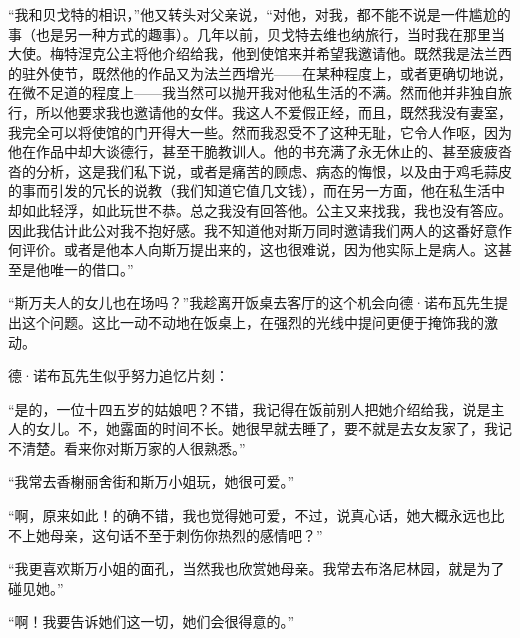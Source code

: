 \par “我和贝戈特的相识，”他又转头对父亲说，“对他，对我，都不能不说是一件尴尬的事（也是另一种方式的趣事）。几年以前，贝戈特去维也纳旅行，当时我在那里当大使。梅特涅克公主将他介绍给我，他到使馆来并希望我邀请他。既然我是法兰西的驻外使节，既然他的作品又为法兰西增光——在某种程度上，或者更确切地说，在微不足道的程度上——我当然可以抛开我对他私生活的不满。然而他并非独自旅行，所以他要求我也邀请他的女伴。我这人不爱假正经，而且，既然我没有妻室，我完全可以将使馆的门开得大一些。然而我忍受不了这种无耻，它令人作呕，因为他在作品中却大谈德行，甚至干脆教训人。他的书充满了永无休止的、甚至疲疲沓沓的分析，这是我们私下说，或者是痛苦的顾虑、病态的悔恨，以及由于鸡毛蒜皮的事而引发的冗长的说教（我们知道它值几文钱），而在另一方面，他在私生活中却如此轻浮，如此玩世不恭。总之我没有回答他。公主又来找我，我也没有答应。因此我估计此公对我不抱好感。我不知道他对斯万同时邀请我们两人的这番好意作何评价。或者是他本人向斯万提出来的，这也很难说，因为他实际上是病人。这甚至是他唯一的借口。”
\par “斯万夫人的女儿也在场吗？”我趁离开饭桌去客厅的这个机会向德·诺布瓦先生提出这个问题。这比一动不动地在饭桌上，在强烈的光线中提问更便于掩饰我的激动。
\par 德·诺布瓦先生似乎努力追忆片刻：
\par “是的，一位十四五岁的姑娘吧？不错，我记得在饭前别人把她介绍给我，说是主人的女儿。不，她露面的时间不长。她很早就去睡了，要不就是去女友家了，我记不清楚。看来你对斯万家的人很熟悉。”
\par “我常去香榭丽舍街和斯万小姐玩，她很可爱。”
\par “啊，原来如此！的确不错，我也觉得她可爱，不过，说真心话，她大概永远也比不上她母亲，这句话不至于刺伤你热烈的感情吧？”
\par “我更喜欢斯万小姐的面孔，当然我也欣赏她母亲。我常去布洛尼林园，就是为了碰见她。”
\par “啊！我要告诉她们这一切，她们会很得意的。”
